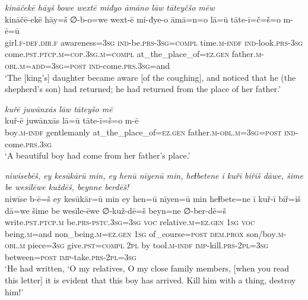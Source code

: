 \ea \label{KŠ.65}
\textit{kināčekē hāyš bowe wextē miđyo āmāno lāw tāteyčšo mēw} \\ 
\gll kināčē-ekē hāy=š ∅-b-o=we wext-ē mi-đye-o āmā=n=o lā=ū tāte-ī=č=š=o m-ē=ū \\ 
 girl\textsc{.f}\textsc{-def}\textsc{.dir}\textsc{.f} awareness\textsc{=3sg} \textsc{ind-}be\textsc{.prs}\textsc{-3sg}\textsc{=compl} time\textsc{.m}\textsc{-indf} \textsc{ind-}look\textsc{.prs}\textsc{-3sg} come\textsc{.pst}\textsc{.ptcp}\textsc{.m}\textsc{=cop}\textsc{.3sg}\textsc{.m}\textsc{=compl} at\_the\_place\_of\textsc{\textsc{=ez.gen}} father\textsc{.m}\textsc{-obl}\textsc{.m}\textsc{=add}\textsc{=3sg}\textsc{=\textsc{post}} \textsc{ind-}come\textsc{.prs}\textsc{.3sg}=and \\ 
\glt `The [king’s] daughter became aware [of the coughing], and noticed that he (the shepherd’s son) had returned; he had returned from the place of her father.'
\z 
 
\ea \label{KŠ.68}
\textit{kuřē juwānxās lāw tāteyšo mē} \\ 
\gll kuř-ē juwānxās lā=ū tāte-ī=š=o m-ē \\ 
 boy\textsc{.m}\textsc{-indf} gentlemanly at\_the\_place\_of\textsc{\textsc{=ez.gen}} father\textsc{.m}\textsc{-obl}\textsc{.m}\textsc{=3sg}\textsc{=\textsc{post}} \textsc{ind-}come\textsc{.prs}\textsc{.3sg} \\ 
\glt `A beautiful boy had come from her father’s place.'
\z 
 
\ea \label{KŠ.72}
\textit{niwīsebēš, ey kesūkārū min, ey henū nīyenū min, heɫbetene ī kuřī biřiš dāwe, šime be wesīlēwe kuždēš, beynne berdēš!} \\ 
\gll niwīse b-ē=š ey kesūkār=ū min ey hen=ū nīyen=ū min heɫbete=ne ī kuř-ī biř=iš dā=we šime be wesīle-ēwe ∅-kuž-dē=š beyn=ne ∅-ber-dē=š \\ 
 write\textsc{.pst}\textsc{.ptcp}\textsc{.m} be\textsc{.prs}\textsc{-pstc}\textsc{.3sg}\textsc{=3sg} \textsc{voc} relative\textsc{.m}\textsc{\textsc{=ez.gen}} \textsc{1sg} \textsc{voc} being\textsc{.m}=and non\_being\textsc{.m}\textsc{\textsc{=ez.gen}} \textsc{1sg} of\_course\textsc{=\textsc{post}} \textsc{dem.prox} son/boy\textsc{.m}\textsc{-obl}\textsc{.m} piece\textsc{=3sg} give\textsc{.pst}\textsc{=compl} \textsc{2pl} by tool\textsc{.m}\textsc{-indf} \textsc{imp-}kill\textsc{.prs}-\textsc{2pl}\textsc{=3sg} between\textsc{=\textsc{post}} \textsc{imp-}take\textsc{.prs}-\textsc{2pl}\textsc{=3sg} \\ 
\glt `He had written, ‘O my relatives, O my close family members, [when you read this letter] it is evident that this boy has arrived. Kill him with a thing, destroy him!'
\z 
 
